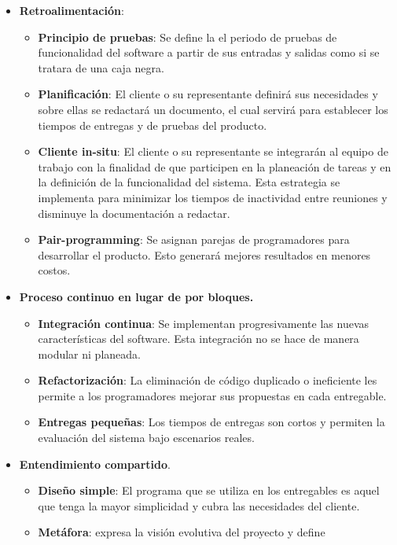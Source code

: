 \begin{itemize}
	\item \textbf{Retroalimentación}:
		\begin{itemize}
			\item \textbf{Principio de pruebas}: Se define la el periodo de pruebas de 
			funcionalidad del software a partir de sus entradas y salidas como si se 
			tratara de una caja negra.
			\item \textbf{Planificación}: El cliente o su representante definirá sus 
			necesidades y sobre ellas se redactará un documento, el cual servirá para 
			establecer los tiempos de entregas y de pruebas del producto.
			\item \textbf{Cliente in-situ}: El cliente o su representante se integrarán 
			al equipo de trabajo con la finalidad de que participen en la planeación de 
			tareas y en la definición de la funcionalidad del sistema. Esta estrategia 
			se implementa para minimizar los tiempos de inactividad entre reuniones y 
			 disminuye la documentación a redactar.
			\item \textbf{Pair-programming}: Se asignan parejas de programadores para 
			desarrollar el producto. Esto generará mejores resultados en menores costos.
		\end{itemize}
	\item \textbf{Proceso continuo en lugar de por bloques.}
		\begin{itemize}
			\item \textbf{Integración continua}: Se implementan progresivamente las 
			nuevas características del software. Esta integración no se hace de manera 
			modular ni planeada.
			\item \textbf{Refactorización}: La eliminación de código duplicado o 
			ineficiente les permite a los programadores mejorar sus propuestas en cada 
			entregable.
			\item \textbf{Entregas pequeñas}: Los tiempos de entregas son cortos y 
			permiten la evaluación del sistema bajo escenarios reales.
		\end{itemize}
	\item \textbf{Entendimiento compartido}.
		\begin{itemize}
			\item \textbf{Diseño simple}: El programa que se utiliza en los entregables 
			es aquel que tenga la mayor simplicidad y cubra las necesidades del cliente.
			\item \textbf{Metáfora}: expresa la visión evolutiva del proyecto y define 

\end{itemize}
\end{itemize}
